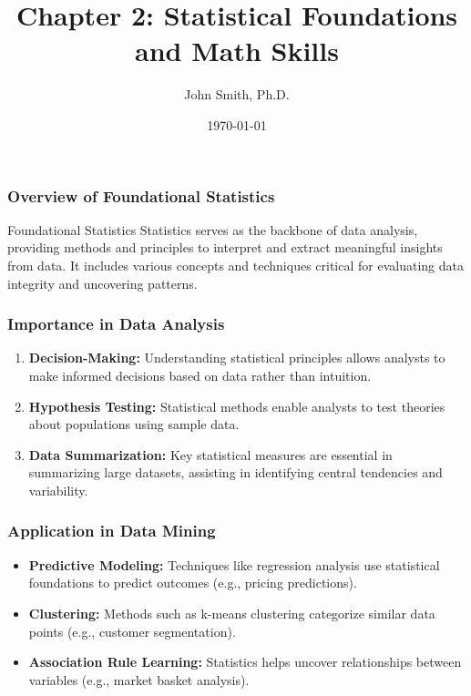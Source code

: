 \documentclass[aspectratio=169]{beamer}
\title[Chapter 2: Statistical Foundations and Math Skills]{Chapter 2: Statistical Foundations and Math Skills}
\author[J. Smith]{John Smith, Ph.D.}
\institute[University Name]{
  Department of Computer Science\\
  University Name\\
  \vspace{0.3cm}
  Email: email@university.edu\\
  Website: www.university.edu
}
\date{\today}
\begin{document}
\frame{\titlepage}

\begin{frame}[fragile]
    \titlepage
\end{frame}

\begin{frame}[fragile]
    \frametitle{Overview of Foundational Statistics}
    \begin{block}{Foundational Statistics}
        Statistics serves as the backbone of data analysis, providing methods and principles to interpret and extract meaningful insights from data. It includes various concepts and techniques critical for evaluating data integrity and uncovering patterns.
    \end{block}
\end{frame}

\begin{frame}[fragile]
    \frametitle{Importance in Data Analysis}
    \begin{enumerate}
        \item \textbf{Decision-Making:} Understanding statistical principles allows analysts to make informed decisions based on data rather than intuition.
        \item \textbf{Hypothesis Testing:} Statistical methods enable analysts to test theories about populations using sample data.
        \item \textbf{Data Summarization:} Key statistical measures are essential in summarizing large datasets, assisting in identifying central tendencies and variability.
    \end{enumerate}
\end{frame}

\begin{frame}[fragile]
    \frametitle{Application in Data Mining}
    \begin{itemize}
        \item \textbf{Predictive Modeling:} Techniques like regression analysis use statistical foundations to predict outcomes (e.g., pricing predictions).
        \item \textbf{Clustering:} Methods such as k-means clustering categorize similar data points (e.g., customer segmentation).
        \item \textbf{Association Rule Learning:} Statistics helps uncover relationships between variables (e.g., market basket analysis).
    \end{itemize}
\end{frame}
\end{document}
